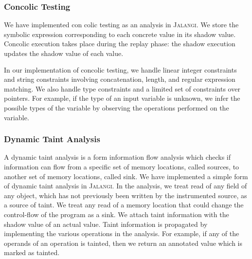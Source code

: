 \documentclass{sig-alternate}
\def\jalangi{\textsc{Jalangi}}
\begin{document}
\subsubsection*{Concolic Testing}
\label{sec:concolic-testing}

We have implemented con colic testing as an analysis in \jalangi{}.
We store the symbolic expression corresponding to each concrete value
in its shadow value.  Concolic execution takes place during the replay
phase: the shadow execution updates the shadow value of each
value.  %

In our implementation of concolic testing, we handle linear integer
constraints and string constraints involving concatenation, length,
and regular expression matching.  We also handle type constraints and
a limited set of constraints over pointers.  For example, if the type
of an input variable is unknown, we infer the possible types of the
variable by observing the operations performed on the variable.

\subsubsection*{Dynamic Taint Analysis}
\label{sec:taint-analysis}

A dynamic taint analysis is a form information flow analysis which
checks if information can flow from a specific set of memory
locations, called sources, to another set of memory locations, called
sink.  We have implemented a simple form of dynamic taint analysis in
\jalangi{}.  In the analysis, we treat read of any field of any
object, which has not previously been written by the instrumented
source, as a source of taint.  We treat any read of a memory location
that could change the control-flow of the program as a sink.  We
attach taint information with the shadow value of an actual value.
Taint information is propagated by implementing the various operations
in the analysis.  For example, if any of the operands of an operation
is tainted, then we return an annotated value which is marked as
tainted.
\end{document}
